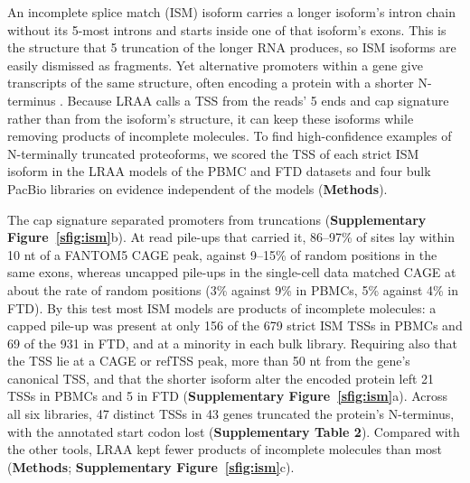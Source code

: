 An incomplete splice match (ISM) isoform carries a longer isoform's intron chain without its 5\p{}-most introns and starts inside one of that isoform's exons. This is the structure that 5\p{} truncation of the longer RNA produces, so ISM isoforms are easily dismissed as fragments. Yet alternative promoters within a gene give transcripts of the same structure, often encoding a protein with a shorter N-terminus \citep{carninci2006,davuluri2008}. Because LRAA calls a TSS from the reads' 5\p{} ends and cap signature rather than from the isoform's structure, it can keep these isoforms while removing products of incomplete molecules. To find high-confidence examples of N-terminally truncated proteoforms, we scored the TSS of each strict ISM isoform in the LRAA models of the PBMC and FTD datasets and four bulk PacBio libraries on evidence independent of the models (\textbf{Methods}).

The cap signature separated promoters from truncations (\textbf{Supplementary Figure~\ref{sfig:ism}}b). At read pile-ups that carried it, 86--97\% of sites lay within 10 nt of a FANTOM5 CAGE peak, against 9--15\% of random positions in the same exons, whereas uncapped pile-ups in the single-cell data matched CAGE at about the rate of random positions (3\% against 9\% in PBMCs, 5\% against 4\% in FTD). By this test most ISM models are products of incomplete molecules: a capped pile-up was present at only 156 of the 679 strict ISM TSSs in PBMCs and 69 of the 931 in FTD, and at a minority in each bulk library. Requiring also that the TSS lie at a CAGE or refTSS \citep{abugessaisa2019} peak, more than 50 nt from the gene's canonical TSS, and that the shorter isoform alter the encoded protein left 21 TSSs in PBMCs and 5 in FTD (\textbf{Supplementary Figure~\ref{sfig:ism}}a). Across all six libraries, 47 distinct TSSs in 43 genes truncated the protein's N-terminus, with the annotated start codon lost (\textbf{Supplementary Table 2}). Compared with the other tools, LRAA kept fewer products of incomplete molecules than most (\textbf{Methods}; \textbf{Supplementary Figure~\ref{sfig:ism}}c).

